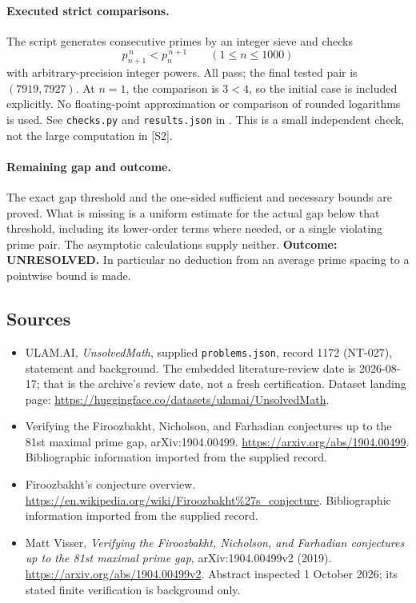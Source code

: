 \documentclass[11pt,a4paper]{article}
\begin{document}
\paragraph{Executed strict comparisons.}
The script generates consecutive primes by an integer sieve and checks
\[
 p_{n+1}^{\,n}<p_n^{\,n+1}\qquad(1\le n\le1000)
\]
with arbitrary-precision integer powers. All pass; the final tested
pair is $(7919,7927)$. At $n=1$, the comparison is $3<4$, so the
initial case is included explicitly. No floating-point approximation
or comparison of rounded logarithms is used. See
\texttt{checks.py} and \texttt{results.json} in
.
This is a small independent check, not the large computation in [S2].

\paragraph{Remaining gap and outcome.}
The exact gap threshold and the one-sided sufficient and necessary
bounds are proved. What is missing is a uniform estimate for the actual
gap below that threshold, including its lower-order terms where needed,
or a single violating prime pair. The asymptotic calculations supply
neither. \textbf{Outcome: UNRESOLVED.} In particular no deduction from
an average prime spacing to a pointwise bound is made.

\subsection{Sources}

{\small

\begin{itemize}

\item[\hypertarget{source:1172:1}{S1}] ULAM.AI, \emph{UnsolvedMath}, supplied \texttt{problems.json}, record 1172 (NT-027), statement and background. The embedded literature-review date is 2026-08-17; that is the archive’s review date, not a fresh certification. Dataset landing page: \url{https://huggingface.co/datasets/ulamai/UnsolvedMath}.

\item[\hypertarget{source:1172:2}{S2}] Verifying the Firoozbakht, Nicholson, and Farhadian conjectures up to the 81st maximal prime gap, arXiv:1904.00499. \url{https://arxiv.org/abs/1904.00499}. Bibliographic information imported from the supplied record.

\item[\hypertarget{source:1172:3}{S3}] Firoozbakht's conjecture overview. \url{https://en.wikipedia.org/wiki/Firoozbakht%27s_conjecture}. Bibliographic information imported from the supplied record.


\item[E1] Matt Visser, \emph{Verifying the Firoozbakht,
Nicholson, and Farhadian conjectures up to the 81st maximal prime gap},
arXiv:1904.00499v2 (2019).
\url{https://arxiv.org/abs/1904.00499v2}. Abstract inspected
1 October 2026; its stated finite verification is background only.

\end{itemize}

}

\label{end:1172}
\end{document}
